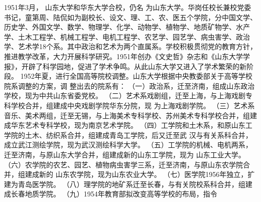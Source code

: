 \documentclass{sduthesis}
\begin{document}
1951年3月， 山东大学和华东大学合校，仍名 为山东大学。华岗任校长兼校党委书记，童第周、陆侃如为副校长、设文、理、工、农、医五个学院，分中国文学、历史学、外国文学、数学、物理学、化学、动物学、植物学、地质矿物学、水产学、土木工程学、机械工程学、电机工程学、农艺学、园艺学、病虫害学、政治 学、艺术学18个系。其中政治和艺术为两个直属系。学校积极贯彻党的教育方针，推进教学改革，大力开展科学研究。1951年创办《文史哲》杂志和《山东大学学报》，开辟了科学园地，促进了学术争鸣。从此山东大学又进入了学术繁荣的新阶段。 1952年夏，进行全国高等院校调整。山东大学根据中央教委部关于高等学校院系调整的方案，调 整出去的院系有： （一）政治系，迁至济南，组成山东政治学校，现为中共山东省委党校。 （二）艺术系戏剧组，迁至上海，与上海戏剧专科学校合并，组建成中央戏剧学院华东分院，现 为上海戏剧学院。 （三）艺术系音乐、美术两组，迁至无锡，与上海美术专科学校、苏州美术专科学校合并，组建 成华东艺术专科学校，现为南京艺术学院。 （四）工学院和土木系，和原山东工学院的土木、纺织系合并，组建成青岛工学院，后又迁至武 汉与有关系科合并，成立武江测绘学院，现为武汉测绘科学大学。 （五）工学院的机械、电机两系，迁至济南，与原山东大学合并，组建成新的山东工学院，现为 山东工业大学。 （六）农学院的农艺、园艺、植物病虫害学三系，迁至济南，与原山东农学院合并，组建成新的 山东农学院，现为山东农业大学。 （七）医学院1956年独立，扩建为青岛医学院。 （八）理学院的地矿系迁至长春，与有关院校系科合并，组建成长春地质学院。 （九）1954年教育部拟改变高等学校的布局，指令
\end{document}

